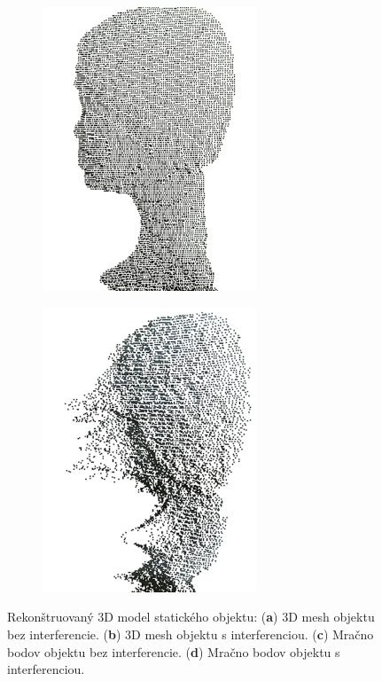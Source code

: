 \begin{figure}[h]
\begin{subfigure}[b]{0.24\textwidth}
		\caption{}
		\label{fig:3dm:a}
	\end{subfigure}
	\hfill
	\begin{subfigure}[b]{0.24\textwidth}
		\centering
		\includegraphics[width=0.7\textwidth]{figures/3dmodels-d.png}
		\caption{}
		\label{fig:3dm:d}
	\end{subfigure}
	\hfill
	\begin{subfigure}[b]{0.24\textwidth}
		\centering
		\includegraphics[width=0.7\textwidth]{figures/3dmodels-b.png}
		\caption{}
		\label{fig:3dm:c}
	\end{subfigure}
	\caption{Rekonštruovaný 3D model statického objektu: (\textbf{a}) 3D mesh objektu bez interferencie. (\textbf{b}) 3D mesh objektu s interferenciou. (\textbf{c}) Mračno bodov objektu bez interferencie. (\textbf{d}) Mračno bodov objektu s interferenciou.}
	\label{fig:3dm}
\end{figure}

